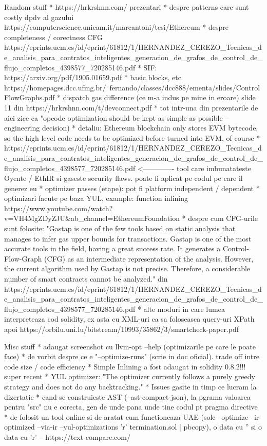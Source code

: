 Random stuff
  * https://hrkrshnn.com/ prezentari
  * despre patterns care sunt costly dpdv al gazului https://computerscience.unicam.it/marcantoni/tesi/Ethereum%
  * despre completeness / corectness CFG https://eprints.ucm.es/id/eprint/61812/1/HERNANDEZ_CEREZO_Tecnicas_de_analisis_para_contratos_inteligentes_generacion_de_grafos_de_control_de_flujo_completos_4398577_720285146.pdf
  * SIF: https://arxiv.org/pdf/1905.01659.pdf
  * basic blocks, etc https://homepages.dcc.ufmg.br/~fernando/classes/dcc888/ementa/slides/ControlFlowGraphs.pdf
  * dispatch gas difference (ce m-a indus pe mine in eroare) slide 11 din https://hrkrshnn.com/t/devconnect.pdf
    * tot intr-una din prezentarile de aici zice ca "opcode optimization should be kept as simple as possible – engineering decision)
  * detaliu: Ethereum blockchain only stores EVM bytecode, so the high level code needs to be optimized before turned into EVM, of course
  * https://eprints.ucm.es/id/eprint/61812/1/HERNANDEZ_CEREZO_Tecnicas_de_analisis_para_contratos_inteligentes_generacion_de_grafos_de_control_de_flujo_completos_4398577_720285146.pdf     <------------- tool care imbunatateste Oyente / EthIR si gaseste security flaws. poate fi aplicat pe codul pe care il generez eu
  * optimizer passes (etape): pot fi platform independent / dependent
  * optimizari facute pe baza YUL, example: function inlining https://www.youtube.com/watch?v=VH4MgZDyZJU&ab_channel=EthereumFoundation
  * despre cum CFG-urile sunt folosite: "Gastap is one of the few tools based on static analysis that manages to infer gas upper
  bounds for transactions. Gastap is one of the most accurate tools in the field, having a
  great success rate. It generates a Control-Flow-Graph (CFG) as an intermediate representation of the analysis. However, the current algorithm used by Gastap is not precise.
  Therefore, a considerable number of smart contracts cannot be analyzed." din https://eprints.ucm.es/id/eprint/61812/1/HERNANDEZ_CEREZO_Tecnicas_de_analisis_para_contratos_inteligentes_generacion_de_grafos_de_control_de_flujo_completos_4398577_720285146.pdf
  * alte moduri in care lumea interpreteaza cod solidity, ex asta cu XML-uri ca sa foloseasca query-uri XPath apoi https://orbilu.uni.lu/bitstream/10993/35862/3/smartcheck-paper.pdf


Misc stuff
* adaugat screenshot cu llvm-opt --help (optimizarile pe care le poate face)
* de vorbit despre ce e "--optimize-runs" (scrie in doc oficial). trade off intre code size / code efficiency
* Simple Inlining a fost adaugat in solidity 0.8.2!!! super recent
* YUL optimizer: "The optimizer currently follows a purely greedy strategy and does not do any backtracking."
* Issues gasite in timp ce lucram la dizertatie
  * cand se construieste AST (--ast-compact-json), la pgrama valoarea pentru "src" nu e corecta, gen de unde pana unde tine codul pt pragma directive
* de folosit un tool online si de aratat cum functioneaza UAE (solc --optimize --ir-optimized --via-ir --yul-optimizations 'r'  termination.sol | pbcopy), o data cu '' si o data cu 'r'    –   https://text-compare.com/


